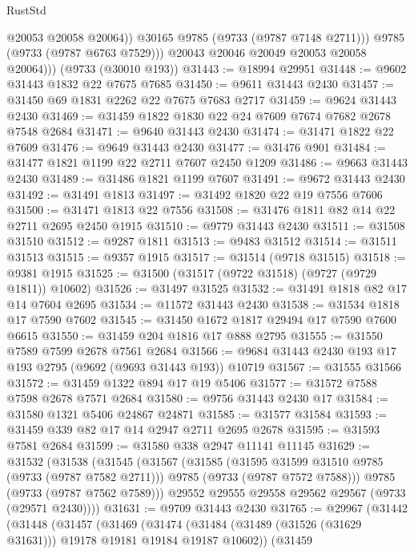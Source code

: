 \begin{lexlean}{RustStd}
\begin{coremodule}
                  @20053
                  @20058
                  @20064))
              @30165
              @9785
              (@9733 (@9787 @7148 @2711)))
            @9785
            (@9733 (@9787 @6763 @7529)))
          @20043
          @20046
          @20049
          @20053
          @20058
          @20064)))
    (@9733 (@30010 @193))
@31443 := @18994 @29951
@31448 := @9602 @31443 @1832 @22 @7675 @7685
@31450 := @9611 @31443 @2430
@31457 := @31450 @69 @1831 @2262 @22 @7675 @7683 @2717
@31459 := @9624 @31443 @2430
@31469 := @31459 @1822 @1830 @22 @24 @7609 @7674 @7682 @2678 @7548 @2684
@31471 := @9640 @31443 @2430
@31474 := @31471 @1822 @22 @7609
@31476 := @9649 @31443 @2430
@31477 := @31476 @901
@31484 := @31477 @1821 @1199 @22 @2711 @7607 @2450 @1209
@31486 := @9663 @31443 @2430
@31489 := @31486 @1821 @1199 @7607
@31491 := @9672 @31443 @2430
@31492 := @31491 @1813
@31497 := @31492 @1820 @22 @19 @7556 @7606
@31500 := @31471 @1813 @22 @7556
@31508 := @31476 @1811 @82 @14 @22 @2711 @2695 @2450 @1915
@31510 := @9779 @31443 @2430
@31511 := @31508 @31510
@31512 := @9287 @1811
@31513 := @9483 @31512
@31514 := @31511 @31513
@31515 := @9357 @1915
@31517 := @31514 (@9718 @31515)
@31518 := @9381 @1915
@31525 := @31500 (@31517 (@9722 @31518) (@9727 (@9729 @1811)) @10602)
@31526 := @31497 @31525
@31532 := @31491 @1818 @82 @17 @14 @7604 @2695
@31534 := @11572 @31443 @2430
@31538 := @31534 @1818 @17 @7590 @7602
@31545 := @31450 @1672 @1817 @29494 @17 @7590 @7600 @6615
@31550 := @31459 @204 @1816 @17 @888 @2795
@31555 := @31550 @7589 @7599 @2678 @7561 @2684
@31566 := @9684 @31443 @2430 @193 @17 @193 @2795 (@9692 (@9693 @31443 @193)) @10719
@31567 := @31555 @31566
@31572 := @31459 @1322 @894 @17 @19 @5406
@31577 := @31572 @7588 @7598 @2678 @7571 @2684
@31580 := @9756 @31443 @2430 @17
@31584 := @31580 @1321 @5406 @24867 @24871
@31585 := @31577 @31584
@31593 := @31459 @339 @82 @17 @14 @2947 @2711 @2695 @2678
@31595 := @31593 @7581 @2684
@31599 := @31580 @338 @2947 @11141 @11145
@31629 := @31532
    (@31538
      (@31545
        (@31567
          (@31585
            (@31595 @31599 @31510 @9785 (@9733 (@9787 @7582 @2711)))
            @9785
            (@9733 (@9787 @7572 @7588)))
          @9785
          (@9733 (@9787 @7562 @7589)))
        @29552
        @29555
        @29558
        @29562
        @29567
        (@9733 (@29571 @2430))))
@31631 := @9709 @31443 @2430
@31765 := @29967
    (@31442
      (@31448
        (@31457
          (@31469
            (@31474 (@31484 (@31489 (@31526 (@31629 @31631))) @19178 @19181 @19184 @19187 @10602))
            (@31459

\end{coremodule}
\end{lexlean}
